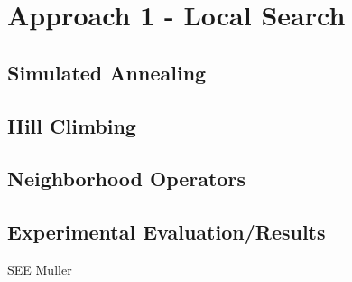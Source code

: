 \chapter{Approach 1 - Local Search}
\label{implementation}
\thispagestyle{plain}

\section{Simulated Annealing}

\section{Hill Climbing}

\section{Neighborhood Operators}

\section{Experimental Evaluation/Results}

SEE Muller

